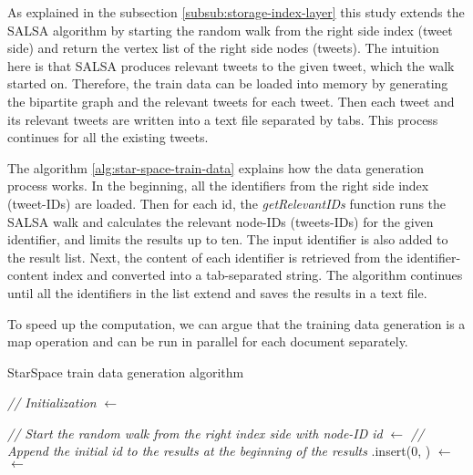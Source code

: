 As explained in the subsection \ref{subsub:storage-index-layer} this study extends the SALSA algorithm by starting the random walk from the right side index (tweet side) and return the vertex list of the right side nodes (tweets). The intuition here is that SALSA produces relevant tweets to the given tweet, which the walk started on. Therefore, the train data can be loaded into memory by generating the bipartite graph and the relevant tweets for each tweet. Then each tweet and its relevant tweets are written into a text file separated by tabs. This process continues for all the existing tweets.


The algorithm \ref{alg:star-space-train-data} explains how the data generation process works. In the beginning, all the identifiers from the right side index (tweet-IDs) are loaded. Then for each id, the \emph{getRelevantIDs} function runs the SALSA walk and calculates the relevant node-IDs (tweets-IDs) for the given identifier, and limits the results up to ten. The input identifier is also added to the result list. Next, the content of each identifier is retrieved from the identifier-content index and converted into a tab-separated string. The algorithm continues until all the identifiers in the list extend and saves the results in a text file.


To speed up the computation, we can argue that the training data generation is a map operation and can be run in parallel for each document separately.


\begin{algorithm}[!ht]
    \caption{StarSpace train data generation algorithm}
    \label{alg:star-space-train-data}




    \SetAlgoLined

    \BlankLine\emph{// Initialization}\BlankLine
    \allIDs $\leftarrow$ \getAllRightIndexKeys{}\;

    \BlankLine

    {
        \emph{// Start the random walk from the right index side with node-ID id}\;
        \listRecommendations $\leftarrow$ \getRelevantIDs{\id}\;
        \BlankLine
        \emph{// Append the initial id to the results at the beginning of the results}\;
        \listRecommendations.insert(0, \id)\;
        \BlankLine
        \listContent $\leftarrow$ \getContentOf{\listRecommendations}\;
        \document $\leftarrow$ \;
        \;
    }

    \BlankLine
\end{algorithm}


